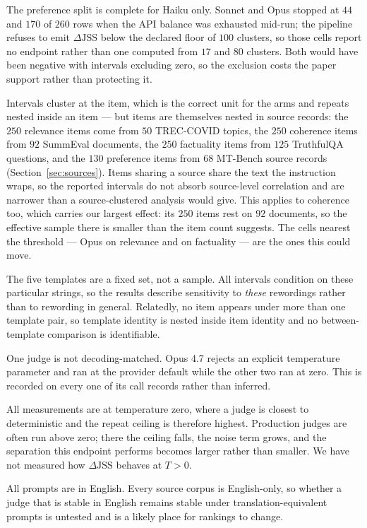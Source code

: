 \documentclass[11pt]{article}          %
\begin{document}
The preference split is complete for Haiku only. Sonnet and Opus stopped at $44$
and $170$ of $260$ rows when the API balance was exhausted mid-run; the pipeline
refuses to emit $\Delta\mathrm{JSS}$ below the declared floor of $100$ clusters,
so those cells report no endpoint rather than one computed from $17$ and $80$
clusters. Both would have been negative with intervals excluding zero, so the
exclusion costs the paper support rather than protecting it.

Intervals cluster at the item, which is the correct unit for the arms and repeats
nested inside an item --- but items are themselves nested in source records: the
$250$ relevance items come from $50$ TREC-COVID topics, the $250$ coherence items
from $92$ SummEval documents, the $250$ factuality items from $125$ TruthfulQA
questions, and the $130$ preference items from $68$ MT-Bench source records
(Section~\ref{sec:sources}). Items sharing a source share the text the
instruction wraps, so the reported intervals do not absorb source-level
correlation and are narrower than a source-clustered analysis would give. This
applies to coherence too, which carries our largest effect: its $250$ items rest
on $92$ documents, so the effective sample there is smaller than the item count
suggests. The cells nearest the threshold --- Opus on relevance and on
factuality --- are the ones this could move.

The five templates are a fixed set, not a sample. All intervals condition on
these particular strings, so the results describe sensitivity to \emph{these}
rewordings rather than to rewording in general. Relatedly, no item appears under
more than one template pair, so template identity is nested inside item identity
and no between-template comparison is identifiable.

One judge is not decoding-matched. Opus 4.7 rejects an explicit temperature
parameter and ran at the provider default while the other two ran at zero. This
is recorded on every one of its call records rather than inferred.

All measurements are at temperature zero, where a judge is closest to
deterministic and the repeat ceiling is therefore highest. Production judges are
often run above zero; there the ceiling falls, the noise term grows, and the
separation this endpoint performs becomes larger rather than smaller. We have not
measured how $\Delta\mathrm{JSS}$ behaves at $T > 0$.

All prompts are in English. Every source corpus is English-only, so whether a
judge that is stable in English remains stable under translation-equivalent
prompts is untested and is a likely place for rankings to change.
\end{document}

